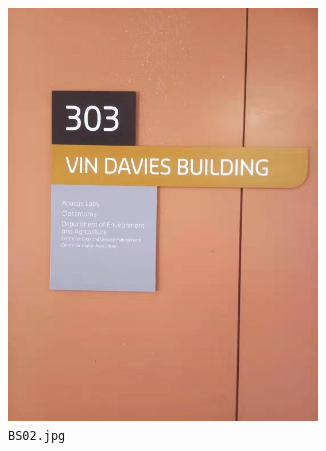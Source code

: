 \documentclass{article}
\begin{document}
\begin{figure}[h]
  \centering
  \begin{subfigure}[t]{0.22\textwidth}
    \centering
    \includegraphics[width=0.9\textwidth]{../train/task1/BS02}
    \caption[BS02]{
      \lstinline{BS02.jpg}
    }
    \label{fig:bs02}
  \end{subfigure}
  \begin{subfigure}[t]{0.22\textwidth}
    \centering

\end{subfigure}
\end{figure}
\end{document}
